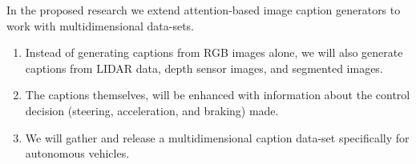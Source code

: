 In the proposed research we extend attention-based image caption generators to work with multidimensional data-sets.
\begin{enumerate}
    \item Instead of generating captions from RGB images alone, we will also generate captions from LIDAR data, depth sensor images, and segmented images. 
    \item The captions themselves, will be enhanced with information about the control decision (steering, acceleration, and braking) made.
    \item We will gather and release a multidimensional caption data-set specifically for autonomous vehicles. 
\end{enumerate}


